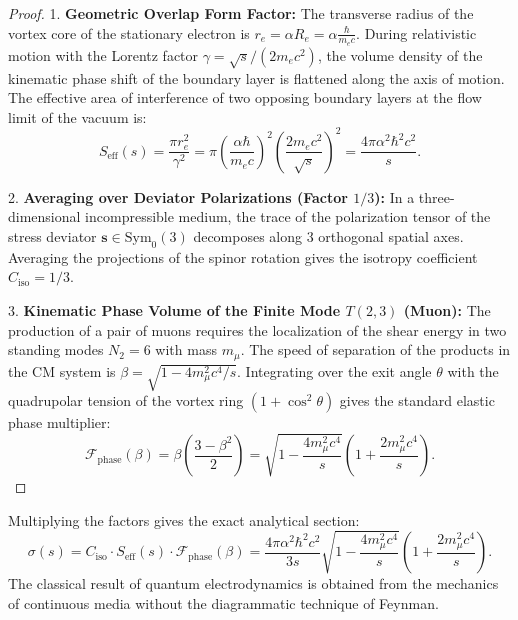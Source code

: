 \documentclass[12pt,a4paper]{article}
\begin{document}
\begin{proof}
	1. \textbf{Geometric Overlap Form Factor:}
	The transverse radius of the vortex core of the stationary electron is $r_e = \alpha R_e = \alpha \frac{\hbar}{m_e c}$. During relativistic motion with the Lorentz factor $\gamma = \sqrt{s} / (2 m_e c^2)$, the volume density of the kinematic phase shift of the boundary layer is flattened along the axis of motion. The effective area of interference of two opposing boundary layers at the flow limit of the vacuum is:
\begin{equation}
S_{\text{eff}}(s) = \frac{\pi r_e^2}{\gamma^2} = \pi \left( \frac{\alpha \hbar}{m_e c} \right)^2 \left( \frac{2 m_e c^2}{\sqrt{s}} \right)^2 = \frac{4\pi \alpha^2 \hbar^2 c^2}{s}.
\end{equation}
																	
2. \textbf{Averaging over Deviator Polarizations (Factor $1/3$):}
In a three-dimensional incompressible medium, the trace of the polarization tensor of the stress deviator $\mathbf{s} \in \mathrm{Sym}_0(3)$ decomposes along 3 orthogonal spatial axes. Averaging the projections of the spinor rotation gives the isotropy coefficient $C_{\text{iso}} = 1/3$.

3. \textbf{Kinematic Phase Volume of the Finite Mode $T(2,3)$ (Muon):}
The production of a pair of muons requires the localization of the shear energy in two standing modes $N_2 = 6$ with mass $m_\mu$. The speed of separation of the products in the CM system is $\beta = \sqrt{1 - 4m_\mu^2 c^4 / s}$. Integrating over the exit angle $\theta$ with the quadrupolar tension of the vortex ring $(1 + \cos^2\theta)$ gives the standard elastic phase multiplier:
\begin{equation}
\mathcal{F}_{\text{phase}}(\beta) = \beta \left( \frac{3 - \beta^2}{2} \right) = \sqrt{1 - \frac{4m_\mu^2 c^4}{s}} \left( 1 + \frac{2m_\mu^2 c^4}{s} \right).
\end{equation}
\end{proof}																	
Multiplying the factors gives the exact analytical section:
\begin{equation}
\sigma(s) = C_{\text{iso}} \cdot S_{\text{eff}}(s) \cdot \mathcal{F}_{\text{phase}}(\beta) = \frac{4\pi \alpha^2 \hbar^2 c^2}{3s} \sqrt{1 - \frac{4m_\mu^2 c^4}{s}} \left( 1 + \frac{2m_\mu^2 c^4}{s} \right).
\end{equation}
The classical result of quantum electrodynamics is obtained from the mechanics of continuous media without the diagrammatic technique of Feynman.
																	
\end{document}
